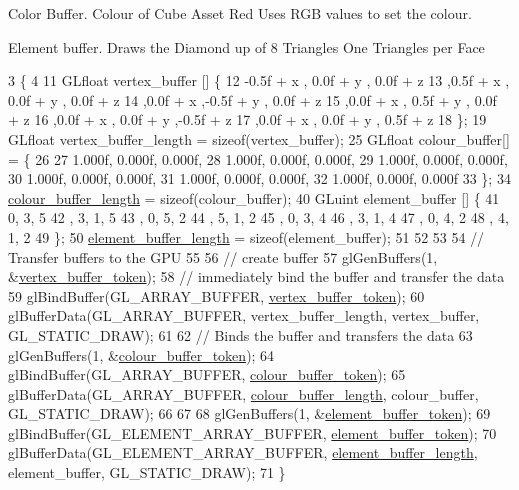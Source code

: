 Color Buffer. Colour of Cube Asset Red Uses R\+G\+B values to set the colour.

Element buffer. Draws the Diamond up of 8 Triangles One Triangles per Face
\begin{DoxyCode}
3                                                           \{
4 
11   GLfloat vertex\_buffer [] \{
12      -0.5f + x  , 0.0f + y   , 0.0f + z
13      ,0.5f + x  , 0.0f + y   , 0.0f + z
14      ,0.0f + x  ,-0.5f + y   , 0.0f + z
15      ,0.0f + x  , 0.5f + y   , 0.0f + z
16      ,0.0f + x  , 0.0f + y   ,-0.5f + z
17      ,0.0f + x  , 0.0f + y   , 0.5f + z
18   \};
19   GLfloat vertex\_buffer\_length = \textcolor{keyword}{sizeof}(vertex\_buffer);
25   GLfloat colour\_buffer[] = \{
26 
27      1.000f, 0.000f, 0.000f,
28      1.000f, 0.000f, 0.000f,
29      1.000f, 0.000f, 0.000f,
30      1.000f, 0.000f, 0.000f,
31      1.000f, 0.000f, 0.000f,
32      1.000f, 0.000f, 0.000f
33   \};
34   \hyperlink{classDiamondAsset_a19cc055d55437b1d93bea8e11ddaf845}{colour\_buffer\_length} = \textcolor{keyword}{sizeof}(colour\_buffer);
40   GLuint element\_buffer []  \{
41       0, 3, 5   
42     , 3, 1, 5
43     , 0, 5, 2   
44     , 5, 1, 2
45     , 0, 3, 4
46     , 3, 1, 4
47     , 0, 4, 2
48     , 4, 1, 2
49   \};
50   \hyperlink{classDiamondAsset_a3fe4461f114f4370a9d800e4425f1c8a}{element\_buffer\_length} = \textcolor{keyword}{sizeof}(element\_buffer);
51 
52 
53 
54   \textcolor{comment}{// Transfer buffers to the GPU}
55 
56   \textcolor{comment}{// create buffer}
57   glGenBuffers(1, &\hyperlink{classDiamondAsset_ac1965c61c0cfd5719c5c01bac98fd312}{vertex\_buffer\_token});
58   \textcolor{comment}{// immediately bind the buffer and transfer the data}
59   glBindBuffer(GL\_ARRAY\_BUFFER, \hyperlink{classDiamondAsset_ac1965c61c0cfd5719c5c01bac98fd312}{vertex\_buffer\_token});
60   glBufferData(GL\_ARRAY\_BUFFER, vertex\_buffer\_length, vertex\_buffer, GL\_STATIC\_DRAW);
61 
62   \textcolor{comment}{// Binds the buffer and transfers the data}
63   glGenBuffers(1, &\hyperlink{classDiamondAsset_a500edbd99d521120d7028f3bf4c24743}{colour\_buffer\_token});
64   glBindBuffer(GL\_ARRAY\_BUFFER, \hyperlink{classDiamondAsset_a500edbd99d521120d7028f3bf4c24743}{colour\_buffer\_token});
65   glBufferData(GL\_ARRAY\_BUFFER, \hyperlink{classDiamondAsset_a19cc055d55437b1d93bea8e11ddaf845}{colour\_buffer\_length}, colour\_buffer, GL\_STATIC\_DRAW);
66 
67 
68   glGenBuffers(1, &\hyperlink{classDiamondAsset_aa2ad44c331156835eba1ed5175bde2e6}{element\_buffer\_token});
69   glBindBuffer(GL\_ELEMENT\_ARRAY\_BUFFER, \hyperlink{classDiamondAsset_aa2ad44c331156835eba1ed5175bde2e6}{element\_buffer\_token});
70   glBufferData(GL\_ELEMENT\_ARRAY\_BUFFER, \hyperlink{classDiamondAsset_a3fe4461f114f4370a9d800e4425f1c8a}{element\_buffer\_length}, element\_buffer, 
      GL\_STATIC\_DRAW);
71 \}
\end{DoxyCode}
\hypertarget{classDiamondAsset_a1b7bf6ba76651a9304943f2c41fe36b8}{}
